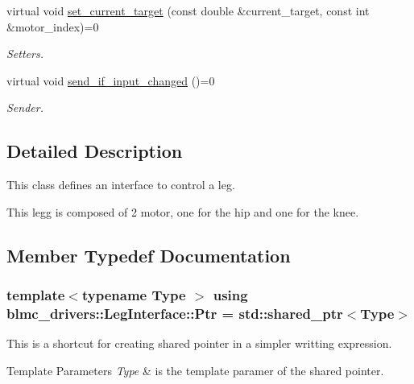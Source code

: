 \begin{DoxyCompactItemize}
virtual void \hyperlink{classblmc__drivers_1_1LegInterface_a6917a158f12589c9ee6aa45304fdafce}{set\+\_\+current\+\_\+target} (const double \&current\+\_\+target, const int \&motor\+\_\+index)=0
\begin{DoxyCompactList}\small\item\em Setters. \end{DoxyCompactList}\item 
virtual void \hyperlink{classblmc__drivers_1_1LegInterface_aaf3d3759b63a3ffe7e9cee360302f9b7}{send\+\_\+if\+\_\+input\+\_\+changed} ()=0
\begin{DoxyCompactList}\small\item\em Sender. \end{DoxyCompactList}\end{DoxyCompactItemize}


\subsection{Detailed Description}
This class defines an interface to control a leg. 

This legg is composed of 2 motor, one for the hip and one for the knee. 

\subsection{Member Typedef Documentation}
\subsubsection[{\texorpdfstring{Ptr}{Ptr}}]{\setlength{\rightskip}{0pt plus 5cm}template$<$typename Type $>$ using {\bf blmc\+\_\+drivers\+::\+Leg\+Interface\+::\+Ptr} =  std\+::shared\+\_\+ptr$<$Type$>$}\hypertarget{classblmc__drivers_1_1LegInterface_ac5af9e6514abff5ee918813925a8e42d}{}\label{classblmc__drivers_1_1LegInterface_ac5af9e6514abff5ee918813925a8e42d}


This is a shortcut for creating shared pointer in a simpler writting expression. 


\begin{DoxyTemplParams}{Template Parameters}
{\em Type} & is the template paramer of the shared pointer. \\
\hline
\end{DoxyTemplParams}


